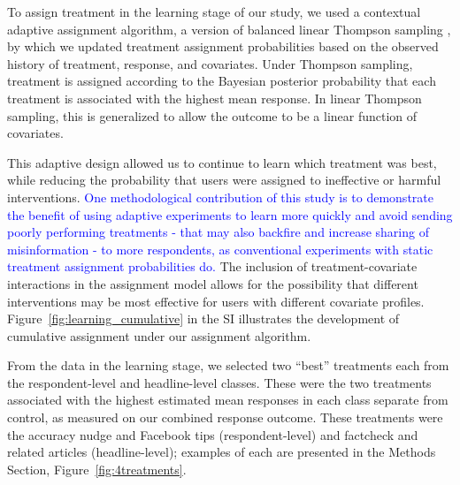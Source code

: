 \documentclass[letterpaper, 12pt, parskip=full,DIV=10]{scrartcl}
\begin{document}
To assign treatment in the learning stage of our study, we used a contextual adaptive assignment algorithm, a version of balanced linear Thompson sampling \citep{dimakopoulou2017estimation,dimakopoulou2019balanced},  by which we updated treatment assignment probabilities based on the observed history of treatment, response, and covariates. 
Under Thompson sampling, treatment is assigned according to the Bayesian posterior probability that each treatment is associated with the highest mean response. In linear Thompson sampling, this is generalized to allow the outcome to be a linear function of covariates. 

This adaptive design allowed us to continue to learn which treatment was best, while reducing the probability that users were assigned to ineffective or harmful interventions. \textcolor{blue}{One methodological contribution of this study is to demonstrate the benefit of using adaptive experiments to learn more quickly and avoid sending poorly performing treatments - that may also backfire and increase sharing of misinformation - to more respondents, as conventional experiments with static treatment assignment probabilities do.} The inclusion of treatment-covariate interactions in the assignment model allows for the possibility that different interventions may be most effective for users with different covariate profiles. 
Figure~\ref{fig:learning_cumulative} in the SI illustrates the development of cumulative assignment under our assignment algorithm. 


From the data in the learning stage, we selected two ``best'' treatments each from the respondent-level and headline-level classes. 
These were the two treatments associated with the highest estimated mean responses in each class separate from control, as measured on our combined response outcome. %
These treatments were the accuracy nudge and Facebook tips (respondent-level) and factcheck and related articles (headline-level); examples of each are presented in the Methods Section, Figure~\ref{fig:4treatments}. 
\end{document}
